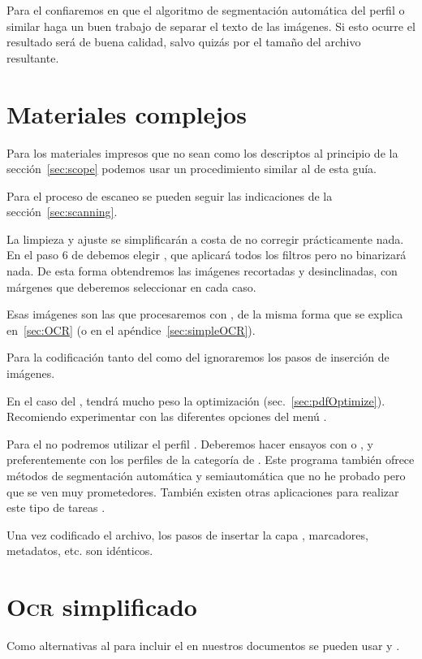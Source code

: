 \documentclass[%
	a5paper,
	10pt,
	twoside,
	openright,
	final,
]{memoir}
\begin{document}
{	Para el \djvu confiaremos en que el algoritmo de segmentación automática del perfil  o similar haga un buen trabajo de separar el texto de las imágenes. Si esto ocurre el resultado será de buena calidad, salvo quizás por el tamaño del archivo resultante.

	\chapter{Materiales complejos\label{sec:complexScans}} Para los materiales impresos que no sean como los descriptos al principio de la sección~\ref{sec:scope} podemos usar un procedimiento similar al de esta guía.

	Para el proceso de escaneo se pueden seguir las indicaciones de la sección~\ref{sec:scanning}.

	La limpieza y ajuste se simplificarán a costa de no corregir prácticamente nada. En el paso 6 de \scantailor debemos elegir , que aplicará todos los filtros pero no binarizará nada. De esta forma obtendremos las imágenes recortadas y desinclinadas, con márgenes que deberemos seleccionar en cada caso.

	Esas imágenes son las que procesaremos con \abbyy, de la misma forma que se explica en~\ref{sec:OCR} (o en el apéndice~\ref{sec:simpleOCR}).

	Para la codificación tanto del \pdf como del \djvu ignoraremos los pasos de inserción de imágenes.

	En el caso del \pdf, tendrá mucho peso la optimización (sec.~\ref{sec:pdfOptimize}). Recomiendo experimentar con las diferentes opciones del menú .

	Para el \djvu no podremos utilizar el perfil . Deberemos hacer ensayos con  o , y preferentemente con los perfiles de la categoría  de \djvusmallmod. Este programa también ofrece métodos de segmentación automática y semiautomática que no he probado pero que se ven muy prometedores. También existen otras aplicaciones para realizar este tipo de tareas \cite{didjvu}.

	Una vez codificado el archivo, los pasos de insertar la capa \ocr, marcadores, metadatos, etc. son idénticos.

	\chapter{\texorpdfstring{\textsc{Ocr}}{OCR} simplificado\label{sec:simpleOCR}} Como alternativas al \abbyy para incluir el \ocr en nuestros documentos se pueden usar \acrobat y \djvueditor.

}
\end{document}
